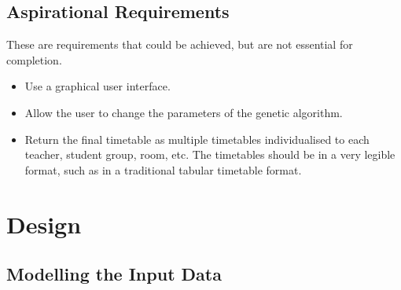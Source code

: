 \documentclass[a4paper, 12pt]{report}
\begin{document}
\section{Aspirational Requirements}

These are requirements that could be achieved, but are not essential for
completion.
\begin{itemize}
	\item Use a graphical user interface.
	\item Allow the user to change the parameters of the genetic algorithm.
	\item Return the final timetable as multiple timetables individualised to
		each teacher, student group, room, etc. The timetables should be in a
		very legible format, such as in a traditional tabular timetable format.
\end{itemize}

\chapter{Design}

\section{Modelling the Input Data}
\end{document}

